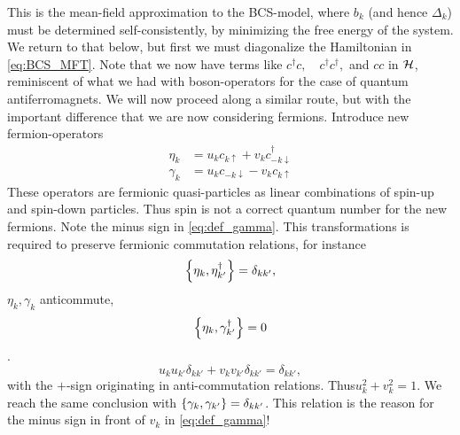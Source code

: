 This is the mean-field approximation to the BCS-model, where $b_k$ (and hence $\Delta_k$) must be determined self-consistently, by minimizing the free energy of the system. We return to that below, but first we must diagonalize the Hamiltonian in \cref{eq:BCS_MFT}. Note that we now have terms like $c^\dagger c, \quad c^\dagger c^\dagger, $ and $cc$ in $\mathcal{H}$, reminiscent of what we had with boson-operators for the case of quantum antiferromagnets. We will now proceed along a similar route, but with the important difference that we are now considering fermions. Introduce new fermion-operators 
\begin{subequations}
	\label{eq:fermion_bogoliubov}
\begin{align}
\label{eq:def_eta} \eta_k &= u_k c_{k\uparrow} + v_k c_{-k\downarrow}^\dagger \\
\label{eq:def_gamma} \gamma_k &=u_kc_{-k\downarrow} - v_k c_{k\uparrow}
\end{align}
\end{subequations}
These operators are fermionic quasi-particles as linear combinations of spin-up and spin-down particles. Thus spin is not a correct quantum number for the new fermions. 
Note the minus sign in \cref{eq:def_gamma}. This transformations is required to preserve fermionic commutation relations, for instance 
\begin{equation}
\label{eq:acomm_eta}
	\acomm{\eta_k}{\eta_{k'}^\dagger} = \delta_{kk'},
\end{equation} $\eta_k, \gamma_k$ anticommute, \[\acomm{\eta_k}{\gamma_{k'}^\dagger} = 0\]. \[u_ku_{k'}\delta_{kk'} + v_kv_{k'}\delta_{kk'} =\delta_{kk'},\]
with the $+$-sign originating in anti-commutation relations. Thus\underline{$u_k^2 + v_k^2 = 1$}. We reach the same conclusion with $\acomm{\gamma_k}{\gamma_{k'}}=\delta_{kk'}$. This relation is the reason for the minus sign in front of $v_k$ in \cref{eq:def_gamma}!

